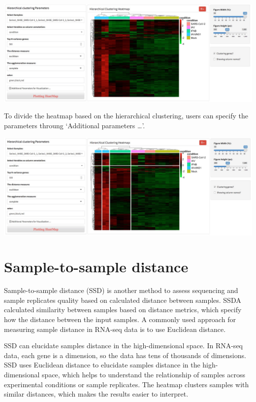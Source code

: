 \documentclass[
  a4paper,
  oneside]{book}
\begin{document}
\includegraphics{images/quality_hca_color.jpeg}

To divide the heatmap based on the hierarchical clustering, users can specify the parameters throung `Additional parameters \ldots{}'.

\includegraphics{images/quality_hca_split.jpeg}

\hypertarget{sample-to-sample-distance}{%
\section{Sample-to-sample distance}\label{sample-to-sample-distance}}

Sample-to-sample distance (SSD) is another method to assess sequencing and sample replicates quality based on calculated distance between samples. SSDA calculated similarity between samples based on distance metrics, which specify how the distance between the input samples. A commonly used approach for measuring sample distance in RNA-seq data is to use Euclidean distance.

SSD can elucidate samples distance in the high-dimensional space. In RNA-seq data, each gene is a dimension, so the data has tens of thousands of dimensions. SSD uses Euclidean distance to elucidate samples distance in the high-dimensional space, which helps to understand the relationship of samples across experimental conditions or sample replicates. The heatmap clusters samples with similar distances, which makes the results easier to interpret.
\end{document}
